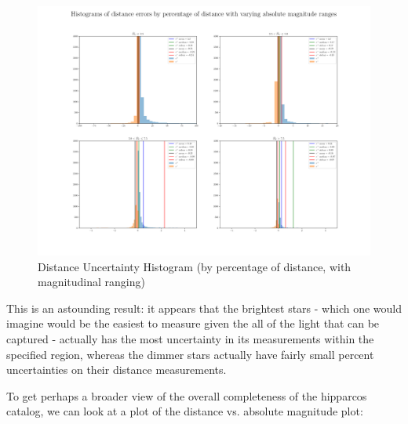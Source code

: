 \documentclass{business-covered} %
\begin{document}
		\begin{figure}[h!]
			\includegraphics[scale=.33]{figures/e_Dist_perc_hist.png}
			\caption{Distance Uncertainty Histogram (by percentage of distance, with magnitudinal ranging)}
		\end{figure}
		
		This is an astounding result: it appears that the brightest stars - which one would imagine would be the easiest to measure given the all of the light that can be captured - actually has the most uncertainty in its measurements within the specified region, whereas the dimmer stars actually have fairly small percent uncertainties on their distance measurements.
		
\pagebreak
		To get perhaps a broader view of the overall completeness of the hipparcos catalog, we can look at a plot of the distance vs. absolute magnitude plot:
		
\end{document}
